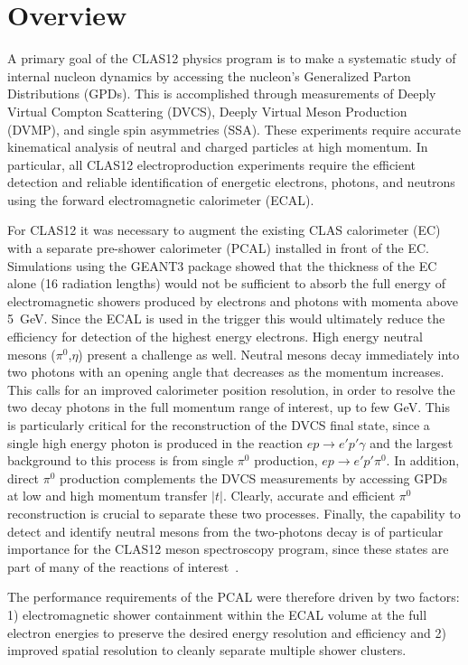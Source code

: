 \section{Overview}

A primary goal of the CLAS12 physics program is to make a systematic study of internal nucleon dynamics by
accessing the nucleon's Generalized Parton Distributions (GPDs). This is accomplished through measurements of
Deeply Virtual Compton Scattering (DVCS), Deeply Virtual Meson Production (DVMP), and single spin asymmetries
(SSA). These experiments require accurate kinematical analysis of neutral and charged particles at high momentum.
In particular, all CLAS12 electroproduction experiments require the efficient detection and reliable identification
of energetic electrons, photons, and neutrons using the forward electromagnetic calorimeter (ECAL).

For CLAS12 it was necessary to augment the existing CLAS calorimeter (EC)~\cite{clas6nim} with a separate
pre-shower calorimeter (PCAL) installed in front of the EC. Simulations using the GEANT3 package showed that the thickness
of the EC alone (16 radiation lengths) would not be sufficient to absorb the full energy of electromagnetic showers
produced by electrons and photons with momenta above 5~GeV. Since the ECAL is used in the trigger this would
ultimately reduce the efficiency for detection of the highest energy electrons. High energy neutral mesons
($\pi^{0}$,$\eta$) present a challenge as well. Neutral mesons decay immediately into two photons with an
opening angle that decreases as the momentum increases. This calls for an improved calorimeter position resolution, in order to resolve the two decay photons in the full momentum range of interest, up to few GeV.  This is particularly critical for the reconstruction
of the DVCS final state, since a single high energy photon is produced in the reaction $ep \to e'p'\gamma$ and the
largest background to this process is from single $\pi^{0}$ production, $ep \to e'p'\pi^{0}$. In addition, direct
$\pi^{0}$ production complements the DVCS measurements by accessing GPDs at low and high momentum transfer
$|t|$. Clearly, accurate and efficient $\pi^{0}$ reconstruction is crucial to separate these two processes. Finally, the capability to detect and identify neutral mesons from the two-photons decay is of particular importance for the CLAS12 meson spectroscopy program, since these states are part of many of the reactions of interest~\cite{MesonSpec}.

The performance requirements of the PCAL were therefore driven by two factors: 1) electromagnetic shower
containment within the ECAL volume at the full electron energies to preserve the desired energy resolution and
efficiency and 2) improved spatial resolution to cleanly separate multiple shower clusters.  




